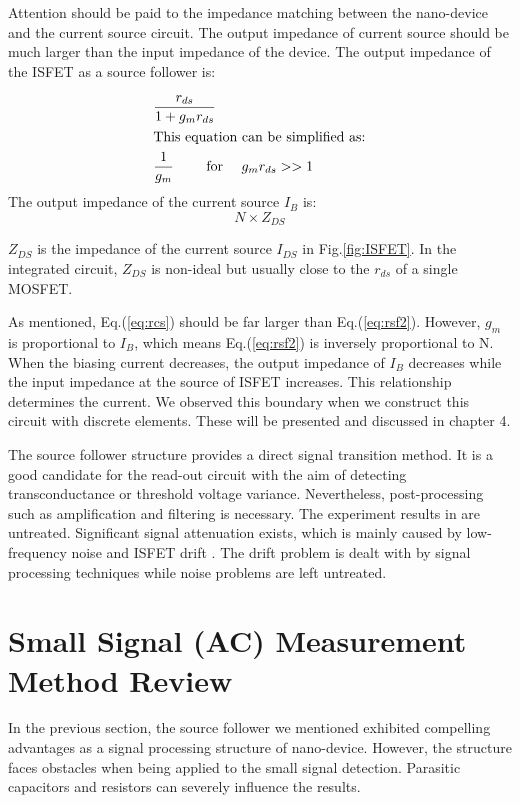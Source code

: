 Attention should be paid to the impedance matching between the nano-device and the current source circuit.
The output impedance of current source should be much larger than the input impedance of the device.
The output impedance of the ISFET as a source follower is:

\begin{align}
    & \frac{r_{ds}}{1 + g_mr_{ds}}\\
\intertext{This equation can be simplified as:}
    & \frac{1}{g_m} \qquad \text{ for } \quad g_mr_{ds} >> 1 \label{eq:rsf2}
\end{align}
The output impedance of the current source $I_B$ is:
\begin{equation} \label{eq:rcs}
    N\times Z_{DS}
\end{equation}

$Z_{DS}$ is the impedance of the current source $I_{DS}$ in Fig.\ref{fig:ISFET}.
In the integrated circuit, $Z_{DS}$ is non-ideal but usually close to the $r_{ds}$ of a single MOSFET.

As mentioned, Eq.(\ref{eq:rcs}) should be far larger than Eq.(\ref{eq:rsf2}).
However, $g_m$ is proportional to $I_B$, which means Eq.(\ref{eq:rsf2}) is inversely proportional to N.
When the biasing current decreases, the output impedance of $I_B$ decreases while the input impedance at the source of ISFET increases.
This relationship determines the current.
We observed this boundary when we construct this circuit with discrete elements.
These will be presented and discussed in chapter 4.

The source follower structure provides a direct signal transition method.
It is a good candidate for the read-out circuit with the aim of detecting transconductance or threshold voltage variance.
Nevertheless, post-processing such as amplification and filtering is necessary.
The experiment results in \cite{SF1} are untreated.
Significant signal attenuation exists, which is mainly caused by low-frequency noise and ISFET drift \cite{Drift}.
The drift problem is dealt with by signal processing techniques while noise problems are left untreated.


\section{Small Signal (AC) Measurement Method Review}  \label{sec:AC}
In the previous section, the source follower we mentioned exhibited compelling advantages as a signal processing structure of nano-device.
However, the structure faces obstacles when being applied to the small signal detection.
Parasitic capacitors and resistors can severely influence the results.

